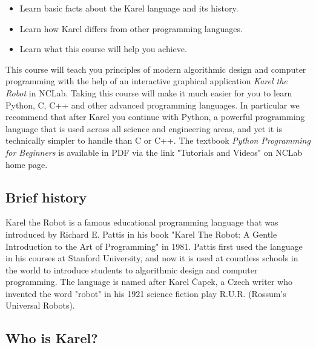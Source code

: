 \documentclass[article,A4,12pt]{llncs}
\begin{document}
\begin{itemize}
\item Learn basic facts about the Karel language and its history. 
\item Learn how Karel differs from other programming languages.
\item Learn what this course will help you achieve.
\end{itemize}
This course will teach you principles of modern algorithmic design and  
computer programming with the help of an interactive graphical application 
{\em Karel the Robot} in NCLab. Taking this course will make it much easier 
for you to learn Python, C, C++ and other advanced programming languages. In particular we 
recommend that after Karel you continue with Python, a powerful programming 
language that is used across all science and engineering areas, and yet it is 
technically simpler to handle than C or C++. The textbook
{\em Python Programming for Beginners} is available in PDF via the link 
"Tutorials and Videos" on NCLab home page.

\subsection{Brief history}

Karel the Robot is a famous educational programming language that was introduced by Richard E. 
Pattis in his book "Karel The Robot: A Gentle Introduction to the Art of Programming" in 1981. 
Pattis first used the language in his courses at Stanford University, and now it is used at 
countless schools in the world to introduce students to algorithmic design and computer programming. 
The language is named after Karel \v{C}apek, a Czech writer who invented the word "robot" in his 1921 
science fiction play R.U.R. (Rossum's Universal Robots).

\subsection{Who is Karel?}
\end{document}
